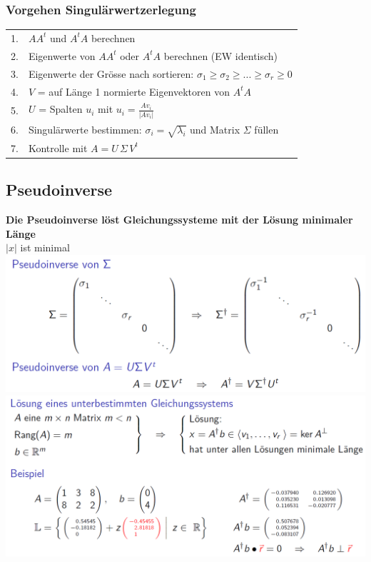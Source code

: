 		   \vfill\null
			\columnbreak
		   
		   \subsubsection{Vorgehen Singulärwertzerlegung}
		   \begin{tabular}{ll}
		   1. & $AA^t$ und $A^tA$ berechnen \\
		   2. & Eigenwerte von $AA^t$ oder $A^tA$ berechnen (EW identisch) \\
		   3. & Eigenwerte der Grösse nach sortieren: $\sigma_1 \geq \sigma_2 \geq ... \geq \sigma_r \geq 0$\\
		   4. & $V$ = auf Länge 1 normierte Eigenvektoren von $A^tA$ \\
		   5. & $U$ = Spalten $u_i$ mit $u_i = \frac{A v_i}{\vert A v_i \vert}$ \\
		   6. & Singulärwerte bestimmen: $\sigma_i = \sqrt{\lambda_i}$ und Matrix $\Sigma$ füllen \\
		   7. & Kontrolle mit $A = U \, \Sigma \, V^t$ \\
		   \end{tabular}
		   
		   
			
	
			
			
		   \subsection{Pseudoinverse}
			\textbf{Die Pseudoinverse löst  Gleichungssysteme mit der Lösung minimaler Länge}		\\   
			$\vert x \vert$ ist minimal \\
		   
		     \includegraphics[width=0.8\linewidth]{Bilder/pseudoinverse} \\
		     
		    \includegraphics[width=0.8\linewidth]{Bilder/pseudoinverse2} \\
		    
		    
		    